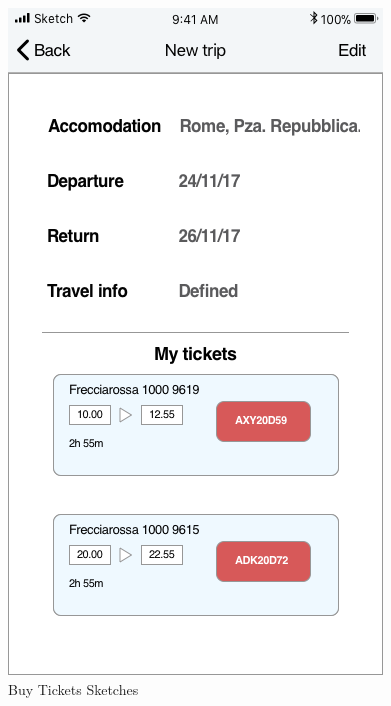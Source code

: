 \begin{figure}[H]
	\includegraphics[scale=0.23]{Images/Interface/Trips/15_trip_review}
	\caption{Buy Tickets Sketches}
\end{figure}